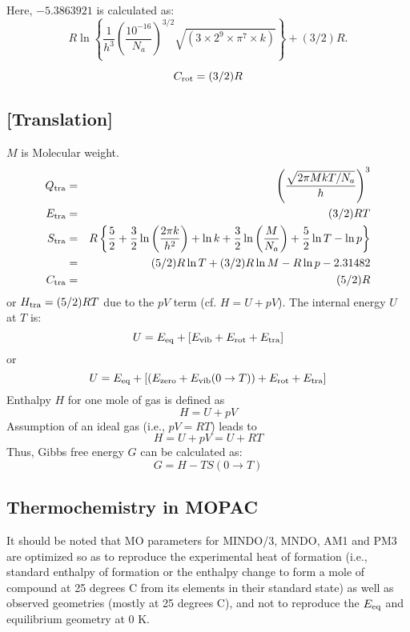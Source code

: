 \documentclass[11pt]{book}
\newcommand{\mi}[1]{#1\index{#1}}
\begin{document}
Here, $-5.386 3921$ is calculated as:
$$ R \ln\left\{\frac{1}{h^3} \left(\frac{10^{-16}}{N_a}\right)^{3/2} 
\sqrt{(3\times 2^9 \times \pi^7 \times k)}\right\} + (3/2)R.
$$

\begin{equation}
C_{\rm rot} = (3/2)R \label{eq18}
\end{equation}

\subsection*{[Translation]}
$M$ is Molecular weight.
\begin{eqnarray}
Q_{\rm tra} & = & \left( \frac{\sqrt{2\pi MkT/N_a}}{h}\right)^3
\label{eq19} \\
E_{\rm tra} & = & (3/2)RT                            \label{eq20} \\
S_{\rm tra} & = & R\left\{ \frac{5}{2} + 
\frac{3}{2}\ln\left(\frac{2\pi k}{h^2}\right) + \ln k + 
\frac{3}{2}\ln\left(\frac{M}{N_a}\right) + \frac{5}{2}\ln T - \ln p \right\}
\label{eq21} \\
            & = & (5/2)R\ln T + (3/2)R\ln M - R\ln p - 2.31482 \label{eq22}\\
C_{\rm tra} & = & (5/2)R                              \label{eq23}
\end{eqnarray}
or  $H_{\rm tra} = (5/2)RT$  due to the $pV$ term (cf.  $H = U + pV$).
The internal energy $U$ at $T$ is:
\begin{equation}
U = E_{\rm eq} + [E_{\rm vib} + E_{\rm rot} + E_{\rm tra}] \label{eq24}
\end{equation}
or
\begin{equation}
U = E_{\rm eq} + [(E_{\rm zero} + E_{\rm vib}(0\rightarrow T)) 
  + E_{\rm rot} + E_{\rm tra}]  \label{eq25}
\end{equation}
Enthalpy $H$ for one mole of gas is defined as
\begin{equation}
H = U + pV     \label{eq26}
\end{equation}
Assumption of an ideal gas (i.e.,  $pV = RT$) leads to
\begin{equation}
H = U + pV = U + RT  \label{eq27} 
\end{equation}
Thus, \mi{Gibbs free energy} $G$ can be calculated as:
\begin{equation}
           G = H - T S(0\rightarrow T) \label{eq28}
\end{equation}

\subsection*{Thermochemistry in MOPAC}
It should be noted that MO parameters for MINDO/3,  MNDO,  AM1  and
PM3  are optimized so as to reproduce the experimental heat of formation
(i.e., standard enthalpy of formation or the enthalpy change to  form  a
mole  of  compound  at  25 degrees C from its elements in their standard
state) as well as observed geometries (mostly at 25 degrees C), and  not
to reproduce the $E_{\rm eq}$ and equilibrium geometry at 0 K.
\end{document}
